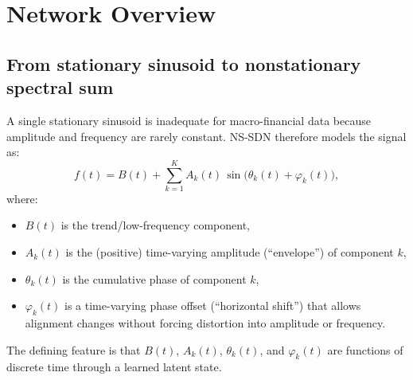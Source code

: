 \section{Network Overview}
\subsection{From stationary sinusoid to nonstationary spectral sum}
A single stationary sinusoid is inadequate for macro-financial data because amplitude and frequency are rarely constant. NS-SDN therefore models the signal as:
\begin{equation}
f(t) = B(t) + \sum_{k=1}^{K} A_k(t)\,\sin\big(\theta_k(t) + \varphi_k(t)\big),
\label{eq:spectralsum}
\end{equation}
where:
\begin{itemize}
\item $B(t)$ is the trend/low-frequency component,
\item $A_k(t)$ is the (positive) time-varying amplitude (``envelope'') of component $k$,
\item $\theta_k(t)$ is the cumulative phase of component $k$,
\item $\varphi_k(t)$ is a time-varying phase offset (``horizontal shift'') that allows alignment changes without forcing distortion into amplitude or frequency.
\end{itemize}
The defining feature is that $B(t)$, $A_k(t)$, $\theta_k(t)$, and $\varphi_k(t)$ are functions of discrete time through a learned latent state.
